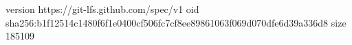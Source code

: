 version https://git-lfs.github.com/spec/v1
oid sha256:b1f12514c1480f6f1e0400cf506fc7cf8ee89861063f069d070dfe6d39a336d8
size 185109
